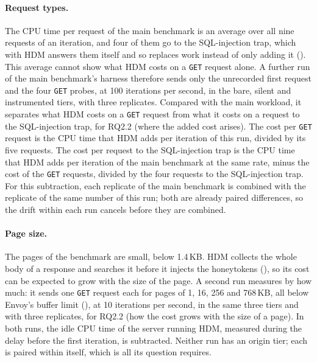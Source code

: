 \documentclass{rptuma}
\begin{document}
\paragraph{Request types.} The CPU time per request of the main benchmark is an average over all
nine requests of an iteration, and four of them go to the SQL-injection trap, which with HDM answers
them itself and so replaces work instead of only adding it (). This
average cannot show what HDM costs on a \texttt{GET} request alone. A further run of the main
benchmark's harness therefore sends only the unrecorded first request and the four \texttt{GET} probes, at 100
iterations per second, in the bare, silent and instrumented tiers, with three replicates. Compared
with the main workload, it separates what HDM costs on a \texttt{GET} request from what it costs on a
request to the SQL-injection trap, for RQ2.2 (where the added cost arises). The cost per
\texttt{GET} request is the CPU time that HDM adds per iteration of this run, divided by its five
requests. The cost per request to the SQL-injection trap is the CPU time that HDM adds per
iteration of the main benchmark at the same rate, minus the cost of the \texttt{GET} requests,
divided by the four requests to the SQL-injection trap. For this subtraction, each replicate of the
main benchmark is combined with the replicate of the same number of this run; both are already
paired differences, so the drift within each run cancels before they are combined.

\paragraph{Page size.} The pages of the benchmark are small, below 1.4\,KB. HDM collects the whole
body of a response and searches it before it injects the honeytokens (),
so its cost can be expected to grow with the size of the page. A second run measures by how much: it
sends one \texttt{GET} request each for pages of 1, 16, 256 and 768\,KB, all below Envoy's buffer
limit (), at 10 iterations per second, in the same three tiers and with
three replicates, for RQ2.2 (how the cost grows with the size of a page). In both runs, the idle CPU time of the server running HDM, measured during the delay before the first iteration, is subtracted. Neither
run has an origin tier; each is paired within itself, which is all its question requires.


\end{document}
